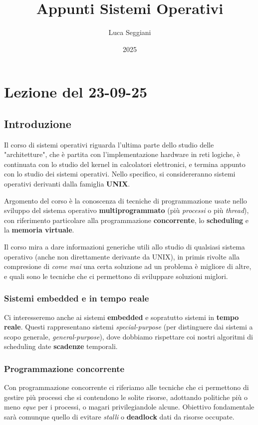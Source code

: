 \documentclass[a4paper,11pt]{article}
\title{Appunti Sistemi Operativi}
\author{Luca Seggiani}
\date{2025}
\begin{document}
\section{Lezione del 23-09-25}

\thispagestyle{empty}
\pagestyle{fancy}

\subsection{Introduzione}
Il corso di sistemi operativi riguarda l'ultima parte dello studio delle "architetture", che è partita con l'implementazione hardware in reti logiche, è continuata con lo studio del kernel in calcolatori elettronici, e termina appunto con lo studio dei sistemi operativi. Nello specifico, si considereranno sistemi operativi derivanti dalla famiglia \textbf{UNIX}.

Argomento del corso è la conoscenza di tecniche di programmazione usate nello sviluppo del sistema operativo \textbf{multiprogrammato} (più \textit{processi} o più \textit{thread}), con riferimento particolare alla programmazione \textbf{concorrente}, lo \textbf{scheduling} e la \textbf{memoria virtuale}. 

Il corso mira a dare informazioni generiche utili allo studio di qualsiasi sistema operativo (anche non direttamente derivante da UNIX), in primis rivolte alla compresione di \textit{come mai} una certa soluzione ad un problema è migliore di altre, e quali sono le tecniche che ci permettono di sviluppare soluzioni miglori.

\subsubsection{Sistemi embedded e in tempo reale}

Ci interesseremo anche ai sistemi \textbf{embedded} e sopratutto sistemi in \textbf{tempo reale}. Questi rappresentano sistemi \textit{special-purpose} (per distinguere dai sistemi a scopo generale, \textit{general-purpose}), dove dobbiamo rispettare coi nostri algoritmi di scheduling date \textbf{scadenze} temporali.

\subsubsection{Programmazione concorrente}
Con programmazione concorrente ci riferiamo alle tecniche che ci permettono di gestire più processi che si contendono le solite risorse, adottando politiche più o meno \textit{eque} per i processi, o magari privilegiandole alcune. 
Obiettivo fondamentale sarà comunque quello di evitare \textit{stalli} o \textbf{deadlock} dati da risorse occupate.
\end{document}
